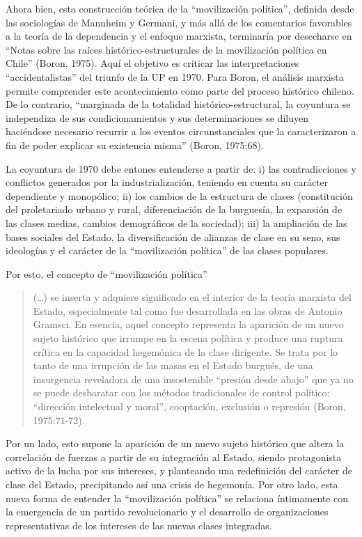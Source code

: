 Ahora bien, esta construcción teórica de la ``movilización política'', definida desde las sociologías de Mannheim y Germani, y más allá de los comentarios favorables a la teoría de la dependencia y el enfoque marxista, terminaría por desecharse en ``Notas sobre las raíces histórico-estructurales de la movilización política en Chile'' (Boron, 1975). Aquí el objetivo es criticar las interpretaciones ``accidentalistas'' del triunfo de la UP en 1970. Para Boron, el análisis marxista permite comprender este acontecimiento como parte del proceso histórico chileno. De lo contrario, ``marginada de la totalidad histórico-estructural, la coyuntura se independiza de sus condicionamientos y sus determinaciones se diluyen haciéndose necesario recurrir a los eventos circunstanciales que la caracterizaron a fin de poder explicar su existencia misma'' (Boron, 1975:68).

La coyuntura de 1970 debe entones entenderse a partir de: i) las contradicciones y conflictos generados por la industrialización, teniendo en cuenta su carácter dependiente y monopólico; ii) los cambios de la estructura de clases (constitución del proletariado urbano y rural, diferenciación de la burguesía, la expansión de las clases medias, cambios demográficos de la sociedad); iii) la ampliación de las bases sociales del Estado, la diversificación de alianzas de clase en su seno, sus ideologías y el carácter de la ``movilización política'' de las clases populares.

Por esto, el concepto de ``movilización política''

\begin{quote}
(\ldots) se inserta y adquiere significado en el interior de la teoría marxista del Estado, especialmente tal como fue desarrollada en las obras de Antonio Gramsci. En esencia, aquel concepto representa la aparición de un nuevo sujeto histórico que irrumpe en la escena política y produce una ruptura crítica en la capacidad hegemónica de la clase dirigente. Se trata por lo tanto de una irrupción de las masas en el Estado burgués, de una insurgencia reveladora de una insostenible ``presión desde abajo'' que ya no se puede desbaratar con los métodos tradicionales de control político: ``dirección intelectual y moral'', cooptación, exclusión o represión (Boron, 1975:71-72).
\end{quote}

Por un lado, esto supone la aparición de un nuevo sujeto histórico que altera la correlación de fuerzas a partir de su integración al Estado, siendo protagonista activo de la lucha por sus intereses, y planteando una redefinición del carácter de clase del Estado, precipitando así una crisis de hegemonía. Por otro lado, esta nueva forma de entender la ``movilización política'' se relaciona íntimamente con la emergencia de un partido revolucionario y el desarrollo de organizaciones representativas de los intereses de las nuevas clases integradas.

